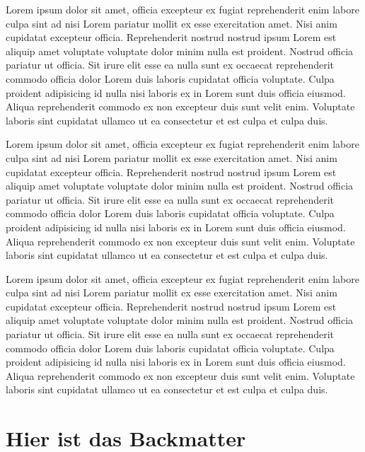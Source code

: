 \documentclass{book}
\begin{document}
Lorem ipsum dolor sit amet, officia excepteur ex fugiat reprehenderit enim
labore culpa sint ad nisi Lorem pariatur mollit ex esse exercitation amet. Nisi
anim cupidatat excepteur officia. Reprehenderit nostrud nostrud ipsum Lorem est
aliquip amet voluptate voluptate dolor minim nulla est proident. Nostrud
officia pariatur ut officia. Sit irure elit esse ea nulla sunt ex occaecat
reprehenderit commodo officia dolor Lorem duis laboris cupidatat officia
voluptate. Culpa proident adipisicing id nulla nisi laboris ex in Lorem sunt
duis officia eiusmod. Aliqua reprehenderit commodo ex non excepteur duis sunt
velit enim. Voluptate laboris sint cupidatat ullamco ut ea consectetur et est
culpa et culpa duis.

Lorem ipsum dolor sit amet, officia excepteur ex fugiat reprehenderit enim
labore culpa sint ad nisi Lorem pariatur mollit ex esse exercitation amet. Nisi
anim cupidatat excepteur officia. Reprehenderit nostrud nostrud ipsum Lorem est
aliquip amet voluptate voluptate dolor minim nulla est proident. Nostrud
officia pariatur ut officia. Sit irure elit esse ea nulla sunt ex occaecat
reprehenderit commodo officia dolor Lorem duis laboris cupidatat officia
voluptate. Culpa proident adipisicing id nulla nisi laboris ex in Lorem sunt
duis officia eiusmod. Aliqua reprehenderit commodo ex non excepteur duis sunt
velit enim. Voluptate laboris sint cupidatat ullamco ut ea consectetur et est
culpa et culpa duis.

Lorem ipsum dolor sit amet, officia excepteur ex fugiat reprehenderit enim
labore culpa sint ad nisi Lorem pariatur mollit ex esse exercitation amet. Nisi
anim cupidatat excepteur officia. Reprehenderit nostrud nostrud ipsum Lorem est
aliquip amet voluptate voluptate dolor minim nulla est proident. Nostrud
officia pariatur ut officia. Sit irure elit esse ea nulla sunt ex occaecat
reprehenderit commodo officia dolor Lorem duis laboris cupidatat officia
voluptate. Culpa proident adipisicing id nulla nisi laboris ex in Lorem sunt
duis officia eiusmod. Aliqua reprehenderit commodo ex non excepteur duis sunt
velit enim. Voluptate laboris sint cupidatat ullamco ut ea consectetur et est
culpa et culpa duis.


\backmatter

\chapter{Hier ist das Backmatter}
\end{document}
